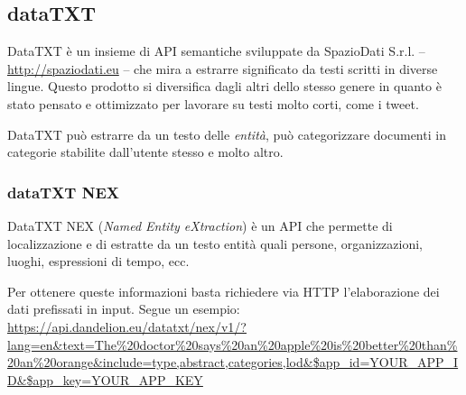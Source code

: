 \subsection{dataTXT}
	DataTXT è un insieme di API semantiche sviluppate da SpazioDati S.r.l.  -- \url{http://spaziodati.eu} -- che mira a estrarre significato da testi scritti in diverse lingue. Questo prodotto si diversifica dagli altri dello stesso genere in quanto è stato pensato e ottimizzato per lavorare su testi molto corti, come i tweet.

	DataTXT può estrarre da un testo delle \emph{entità}, può categorizzare documenti in categorie stabilite dall'utente stesso e molto altro.

%
%

	\subsubsection{dataTXT NEX}
		DataTXT NEX (\emph{Named Entity eXtraction}) è un API che permette di localizzazione e di estratte da un testo entità quali persone, organizzazioni, luoghi, espressioni di tempo, ecc.

		Per ottenere queste informazioni basta richiedere via HTTP l'elaborazione dei dati  prefissati in input. Segue un esempio: \url{https://api.dandelion.eu/datatxt/nex/v1/?lang=en&text=The%20doctor%20says%20an%20apple%20is%20better%20than%20an%20orange&include=type,abstract,categories,lod&$app_id=YOUR_APP_ID&$app_key=YOUR_APP_KEY}

